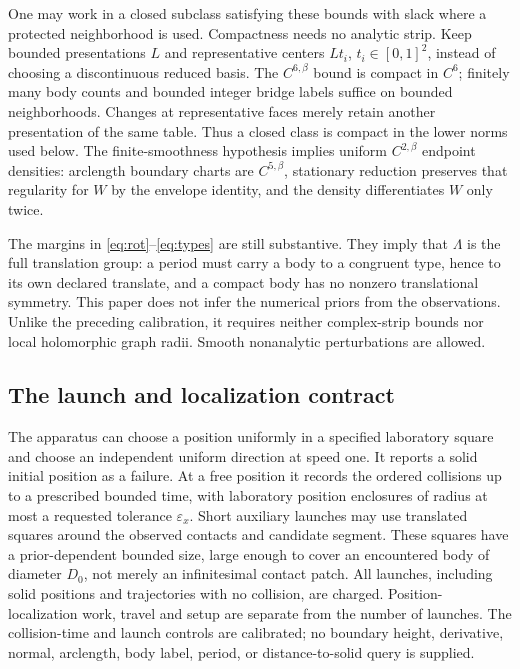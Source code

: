 One may work in a closed subclass satisfying these bounds with slack
where a protected neighborhood is used. Compactness needs no analytic
strip. Keep bounded presentations $L$ and representative centers $Lt_i$,
$t_i\in[0,1]^2$, instead of choosing a discontinuous reduced basis.
The $C^{6,\beta}$ bound is compact in $C^6$; finitely many body counts
and bounded integer bridge labels suffice on bounded neighborhoods.
Changes at representative faces merely retain another presentation of
the same table. Thus a closed class is compact in the lower norms used
below. The finite-smoothness hypothesis implies uniform $C^{2,\beta}$
endpoint densities: arclength boundary charts are $C^{5,\beta}$,
stationary reduction preserves that regularity for $W$ by the envelope
identity, and the density differentiates $W$ only twice.

The margins in \eqref{eq:rot}--\eqref{eq:types} are still substantive.
They imply that $\Lambda$ is the full translation group: a period must
carry a body to a congruent type, hence to its own declared translate,
and a compact body has no nonzero translational symmetry. This paper
does not infer the numerical priors from the observations. Unlike the
preceding calibration, it requires neither complex-strip bounds nor
local holomorphic graph radii. Smooth nonanalytic perturbations are allowed.

\subsection{The launch and localization contract}\label{sec:sensor}
The apparatus can choose a position uniformly in a specified laboratory
square and choose an independent uniform direction at speed one. It
reports a solid initial position as a failure. At a free position it
records the ordered collisions up to a prescribed bounded time, with
laboratory position enclosures of radius at most a requested tolerance
$\varepsilon_x$. Short auxiliary launches may use translated squares
around the observed contacts and candidate segment. These squares have
a prior-dependent bounded size, large enough to cover an encountered
body of diameter $D_0$, not merely an infinitesimal contact patch.
All launches, including solid positions and trajectories with no collision,
are charged. Position-localization work, travel and setup are separate
from the number of launches. The collision-time and launch controls are
calibrated; no boundary height, derivative, normal, arclength, body label,
period, or distance-to-solid query is supplied.

